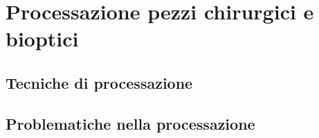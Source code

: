 \chapter{Processazione pezzi chirurgici e bioptici}

\section{Tecniche di processazione}

\section{Problematiche nella processazione}
